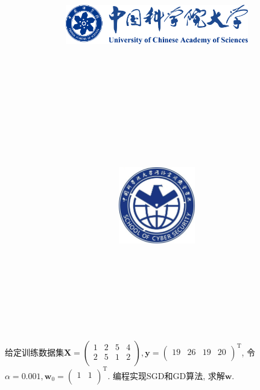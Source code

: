 \documentclass{article}
\title{
	\includegraphics[width=0.6\textwidth]{images/title/ucas_logo 1.pdf}\\
    \vspace{1in}
    \textmd{\textbf{\hmwkClass}}\\
	\textmd{\Large{\textbf{\hmwkClassID}}}\\
    \textmd{\textbf{\hmwkTitle}}\\
    \normalsize\vspace{0.1in}\large{\hmwkCompleteTime }\\
    \vspace{0.1in}\large{\textit{\hmwkClassInstructor\ }}\\
    \vspace{1in}
	\includegraphics[width=0.25\textwidth]{images/title/Cyber.jpg}\\
	\vspace{1in}
}
\author{
	\hmwkAuthorName \\ 
	\hmwkAuthorStuID \\
	\hmwkAuthorInst \\
	\hmwkAuthorzhuanye \\
	\hmwkAuthorfangxiang
	}
\date{}
\begin{document}
\maketitle


%
%
%
%
%

\begin{homeworkProblem}
	给定训练数据集$\boldsymbol{X}=\left( \begin{matrix}
		1&		2&		5&		4\\
		2&		5&		1&		2\\
	\end{matrix} \right) ,\boldsymbol{y}=\left( \begin{matrix}
		19&		26&		19&		20\\
	\end{matrix} \right) ^{\text{T}}$, 令$\alpha=0.001,\boldsymbol{w}_0=\left( \begin{matrix}
		1&		1\\
	\end{matrix} \right) ^{\text{T}}$. 编程实现SGD和GD算法, 求解$\boldsymbol{w}$.


\end{homeworkProblem}
\end{document}
